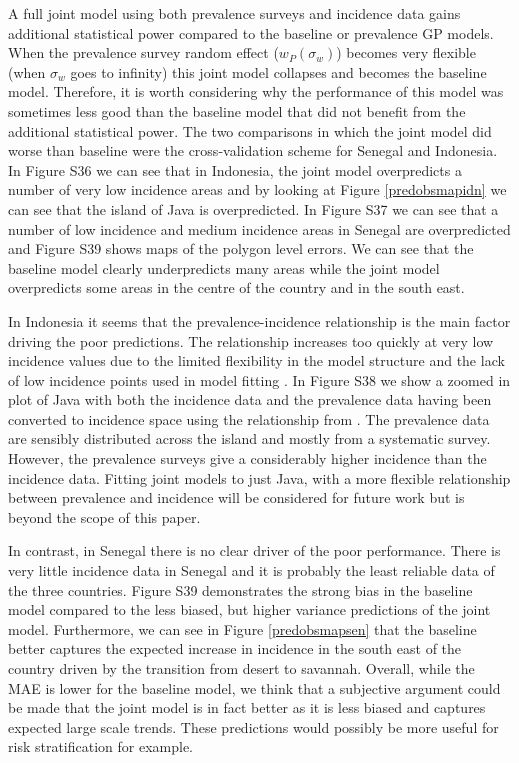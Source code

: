 \documentclass{statsoc}
\begin{document}

A full joint model using both prevalence surveys and incidence data gains additional statistical power compared to the baseline or prevalence GP models.
When the prevalence survey random effect ($w_P(\sigma_w)$) becomes very flexible (when $\sigma_w$ goes to infinity) this joint model collapses and becomes the baseline model.
Therefore, it is worth considering why the performance of this model was sometimes less good than the baseline model that did not benefit from the additional statistical power.
The two comparisons in which the joint model did worse than baseline were the cross-validation scheme for Senegal and Indonesia.
In Figure S36 we can see that in Indonesia, the joint model overpredicts a number of very low incidence areas and by looking at Figure \ref{predobsmapidn} we can see that the island of Java is overpredicted.
In Figure S37 we can see that a number of low incidence and medium incidence areas in Senegal are overpredicted and Figure S39 shows maps of the polygon level errors.
We can see that the baseline model clearly underpredicts many areas while the joint model overpredicts some areas in the centre of the country and in the south east.


In Indonesia it seems that the prevalence-incidence relationship is the main factor driving the poor predictions.
The relationship increases too quickly at very low incidence values due to the limited flexibility in the model structure and the lack of low incidence points used in model fitting \citep{cameron2015defining}.
In Figure S38 we show a zoomed in plot of Java with both the incidence data and the prevalence data having been converted to incidence space using the relationship from \citep{cameron2015defining}.
The prevalence data are sensibly distributed across the island and mostly from a systematic survey.
However, the prevalence surveys give a considerably higher incidence than the incidence data.
Fitting joint models to just Java, with a more flexible relationship between prevalence and incidence will be considered for future work but is beyond the scope of this paper.

In contrast, in Senegal there is no clear driver of the poor performance. 
There is very little incidence data in Senegal and it is probably the least reliable data of the three countries.
Figure S39 demonstrates the strong bias in the baseline model compared to the less biased, but higher variance predictions of the joint model.
Furthermore, we can see in Figure \ref{predobsmapsen} that the baseline better captures the expected increase in incidence in the south east of the country driven by the transition from desert to savannah.
Overall, while the MAE is lower for the baseline model, we think that a subjective argument could be made that the joint model is in fact better as it is less biased and captures expected large scale trends.
These predictions would possibly be more useful for risk stratification for example.
\end{document}
